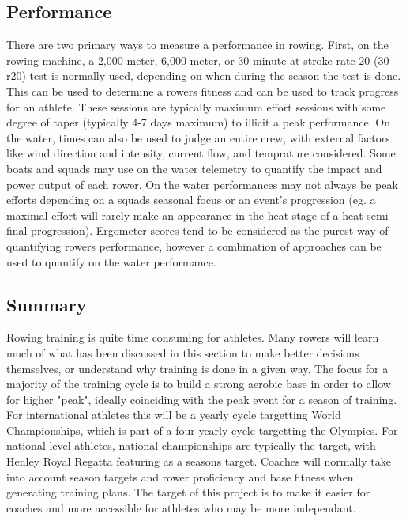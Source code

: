 \subsection{Performance}
There are two primary ways to measure a performance in rowing. First, on the rowing machine, a 2,000 meter, 6,000 meter, or 30 minute at stroke rate 20 (30 r20) test is normally used, depending on when during the season the test is done. This can be used to determine a rowers fitness and can be used to track progress for an athlete. These sessions are typically maximum effort sessions with some degree of taper (typically 4-7 days maximum) to illicit a peak performance. On the water, times can also be used to judge an entire crew, with external factors like wind direction and intensity, current flow, and temprature considered. Some boats and squads may use on the water telemetry to quantify the impact and power output of each rower. On the water performances may not always be peak efforts depending on a squads seasonal focus or an event's progression (eg. a maximal effort will rarely make an appearance in the heat stage of a heat-semi-final progression). Ergometer scores tend to be considered as the purest way of quantifying rowers performance, however a combination of approaches can be used to quantify on the water performance.

\subsection{Summary}
Rowing training is quite time consuming for athletes. Many rowers will learn much of what has been discussed in this section to make better decisions themselves, or understand why training is done in a given way. The focus for a majority of the training cycle is to build a strong aerobic base in order to allow for higher "peak", ideally coinciding with the peak event for a season of training. For international athletes this will be a yearly cycle targetting World Championships, which is part of a four-yearly cycle targetting the Olympics. For national level athletes, national championships are typically the target, with Henley Royal Regatta featuring as a seasons target. Coaches will normally take into account season targets and rower proficiency and base fitness when generating training plans. The target of this project is to make it easier for coaches and more accessible for athletes who may be more independant. 

